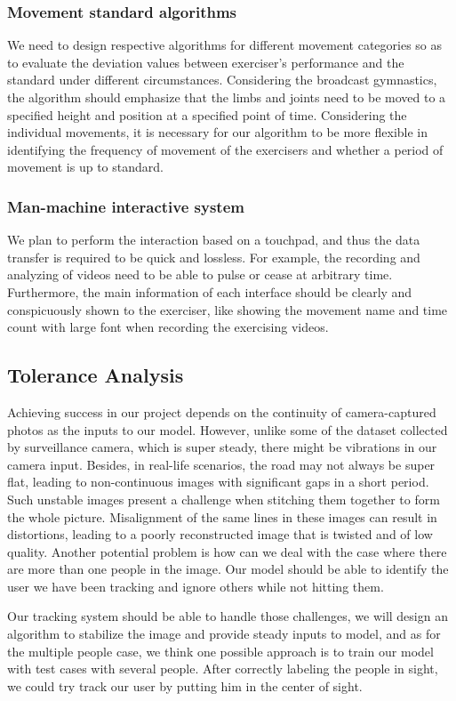 \subsubsection{Movement standard algorithms}
We need to design respective algorithms for different movement categories so as to evaluate the deviation values between exerciser’s performance and the standard under different circumstances. Considering the broadcast gymnastics, the algorithm should emphasize that the limbs and joints need to be moved to a specified height and position at a specified point of time. Considering the individual movements, it is necessary for our algorithm to be more flexible in identifying the frequency of movement of the exercisers and whether a period of movement is up to standard.

\subsubsection{Man-machine interactive system}
We plan to perform the interaction based on a touchpad, and thus the data transfer is required to be quick and lossless. For example, the recording and analyzing of videos need to be able to pulse or cease at arbitrary time. Furthermore, the main information of each interface should be clearly and conspicuously shown to the exerciser, like showing the movement name and time count with large font when recording the exercising videos.


\subsection{Tolerance Analysis}
Achieving success in our project depends on the continuity of camera-captured photos as the inputs to our model. However, unlike some of the dataset collected by surveillance camera, which is super steady, there might be vibrations in our camera input. Besides, in real-life scenarios, the road may not always be super flat, leading to non-continuous images with significant gaps in a short period. Such unstable images present a challenge when stitching them together to form the whole picture. Misalignment of the same lines in these images can result in distortions, leading to a poorly reconstructed image that is twisted and of low quality.
Another potential problem is how can we deal with the case where there are more than one people in the image. Our model should be able to identify the user we have been tracking and ignore others while not hitting them.

Our tracking system should be able to handle those challenges, we will design an algorithm to stabilize the image and provide steady inputs to model, and as for the multiple people case, we think one possible approach is to train our model with test cases with several people. After correctly labeling the people in sight, we could try track our user by putting him in the center of sight.
